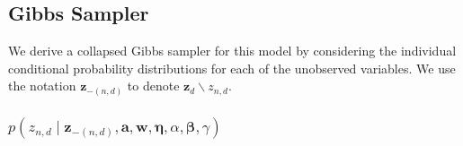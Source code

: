 \subsection{Gibbs Sampler}

We derive a collapsed Gibbs sampler for this model by considering
the individual conditional probability distributions for each of the
unobserved variables. We use the notation $\mathbf{z}_{-(n,d)}$ to
denote $\mathbf{z}_d\backslash z_{n,d}$. %



\subsubsection{$p(z_{n,d}\mid\mathbf{z}_{-(n,d)},\mathbf{a},\mathbf{w},\mathbf{\boldsymbol\eta},\alpha,\boldsymbol\beta,\gamma)$}

